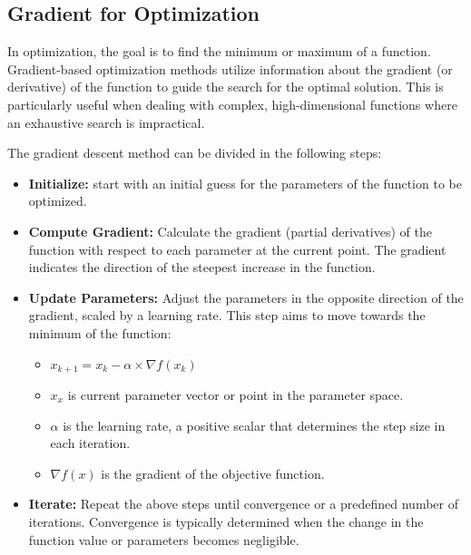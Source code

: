 \documentclass[
  letterpaper,
  DIV=11,
  numbers=noendperiod]{scrreprt}
\providecommand{\tightlist}{%
  \setlength{\itemsep}{0pt}\setlength{\parskip}{0pt}}\usepackage{longtable,booktabs,array}
\begin{document}
\hypertarget{gradient-for-optimization}{%
\subsection{Gradient for Optimization}\label{gradient-for-optimization}}

In optimization, the goal is to find the minimum or maximum of a
function. Gradient-based optimization methods utilize information about
the gradient (or derivative) of the function to guide the search for the
optimal solution. This is particularly useful when dealing with complex,
high-dimensional functions where an exhaustive search is impractical.

The gradient descent method can be divided in the following steps:

\begin{itemize}
\tightlist
\item
  \textbf{Initialize:} start with an initial guess for the parameters of
  the function to be optimized.
\item
  \textbf{Compute Gradient:} Calculate the gradient (partial
  derivatives) of the function with respect to each parameter at the
  current point. The gradient indicates the direction of the steepest
  increase in the function.
\item
  \textbf{Update Parameters:} Adjust the parameters in the opposite
  direction of the gradient, scaled by a learning rate. This step aims
  to move towards the minimum of the function:

  \begin{itemize}
  \tightlist
  \item
    \(x_{k+1} = x_k - \alpha \times \nabla f(x_{k})\)
  \item
    \(x_{x}\) is current parameter vector or point in the parameter
    space.
  \item
    \(\alpha\) is the learning rate, a positive scalar that determines
    the step size in each iteration.
  \item
    \(\nabla f(x)\) is the gradient of the objective function.
  \end{itemize}
\item
  \textbf{Iterate:} Repeat the above steps until convergence or a
  predefined number of iterations. Convergence is typically determined
  when the change in the function value or parameters becomes
  negligible.
\end{itemize}
\end{document}
